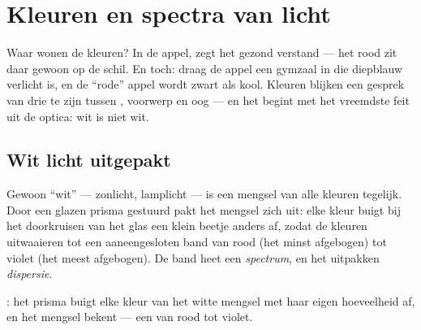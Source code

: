 \chapter{Kleuren en spectra van licht}\label{ch:g8:colors-spectra}

Waar wonen de kleuren? In de appel, zegt het gezond verstand --- het
rood zit daar gewoon op de schil. En toch: draag de appel een gymzaal
in die diepblauw verlicht is, en de ``rode'' appel wordt zwart als
kool. Kleuren blijken een gesprek van drie te zijn tussen
, voorwerp en oog --- en het begint met het vreemdste feit
uit de optica: wit  is niet wit.

\section{Wit licht uitgepakt}

\begin{proposition}\label{prop:g8:colors-spectra:mixture}
Gewoon ``wit''  --- zonlicht, lamplicht --- is een mengsel
van alle kleuren tegelijk. Door een glazen prisma gestuurd pakt het
mengsel zich uit: elke kleur buigt bij het doorkruisen van het glas een
klein beetje anders af, zodat de kleuren uitwaaieren tot een
aaneengesloten band van rood (het minst afgebogen) tot violet (het
meest afgebogen). De band heet een \emph{spectrum}, en
het uitpakken \emph{dispersie}.
\end{proposition}

\begin{omfigure}

{\small {}: het prisma buigt elke kleur van het witte
mengsel met haar eigen hoeveelheid af, en het mengsel bekent --- een
 van rood tot violet.}
\end{omfigure}

